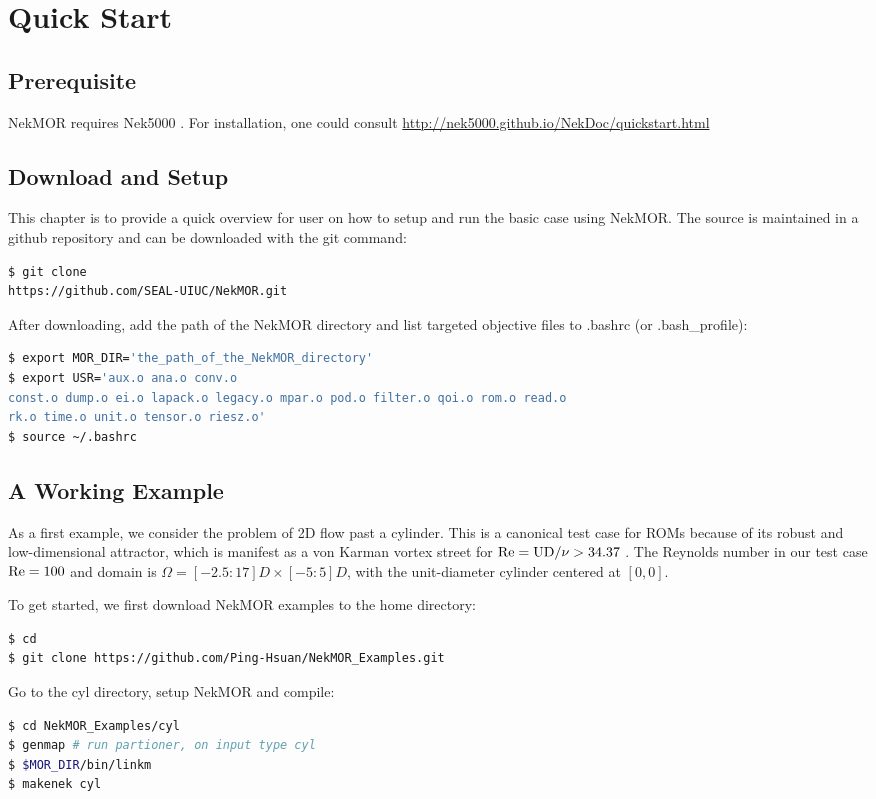 \section{Quick Start} \subsection{Prerequisite} NekMOR requires Nek5000
\cite{fischer2008nek5000}.  For installation, one could consult
\url{http://nek5000.github.io/NekDoc/quickstart.html}

\subsection{Download and Setup} This chapter is to provide a quick overview for
user on how to setup and run the basic case using NekMOR. The source is
maintained in a github repository and can be downloaded with the git command:
\begin{lstlisting}[language=bash] $ git clone
https://github.com/SEAL-UIUC/NekMOR.git \end{lstlisting} 
After downloading, add the path of the NekMOR directory and list targeted
objective files to .bashrc (or .bash\_profile):
\begin{lstlisting}[language=bash] 
$ export MOR_DIR='the_path_of_the_NekMOR_directory' 
$ export USR='aux.o ana.o conv.o
const.o dump.o ei.o lapack.o legacy.o mpar.o pod.o filter.o qoi.o rom.o read.o
rk.o time.o unit.o tensor.o riesz.o' 
$ source ~/.bashrc 
\end{lstlisting}

\subsection{A Working Example} 
As a first example, we consider the problem of 2D
flow past a cylinder. This is a canonical test case for ROMs because of its
robust and low-dimensional attractor, which is manifest as a von Karman vortex
street for $\rm Re = UD/\nu >34.37$ \cite{2021APS..DFDP08001D}. The Reynolds
number in our test case $\rm Re = 100$ and domain is $\Omega = [-2.5 : 17]D
\times [-5 : 5]D$, with the unit-diameter cylinder centered at $[0, 0]$.

To get started, we first download NekMOR examples to the home directory:
\begin{lstlisting}[language=bash]
$ cd 
$ git clone https://github.com/Ping-Hsuan/NekMOR_Examples.git
\end{lstlisting}
Go to the cyl directory, setup NekMOR and compile:
\begin{lstlisting}[language=bash]
$ cd NekMOR_Examples/cyl
$ genmap # run partioner, on input type cyl
$ $MOR_DIR/bin/linkm
$ makenek cyl
\end{lstlisting}

